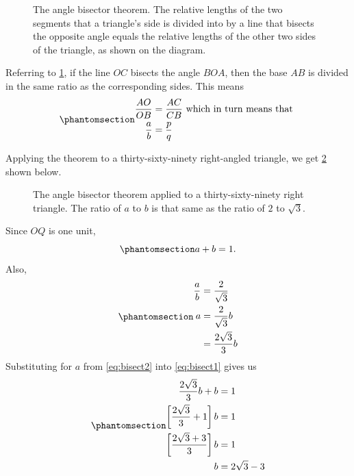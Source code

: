\documentclass[
  a4paper,
]{article}
\begin{document}
\begin{figure}
\centering

\caption{The angle bisector theorem. The relative lengths of the two
segments that a triangle's side is divided into by a line that bisects
the opposite angle equals the relative lengths of the other two sides of
the triangle, as shown on the diagram.}\label{fig:angle-bisector}
\end{figure}

Referring to \cref{fig:angle-bisector}, if the line \(OC\) bisects the
angle \(BOA\), then the base \(AB\) is divided in the same ratio as the
corresponding sides. This means
\begin{equation}\phantomsection\label{eq:angle-bisector}{
\begin{aligned}
\frac{AO}{OB} &= \frac{AC}{CB} \mbox{ which in turn means that }\\
\frac{a}{b} &= \frac{p}{q}\\
\end{aligned}
}\end{equation}

Applying the theorem to a thirty-sixty-ninety right-angled triangle, we
get \cref{fig:bisect-thirty} shown below.

\begin{figure}
\centering

\caption{The angle bisector theorem applied to a thirty-sixty-ninety
right triangle. The ratio of \(a\) to \(b\) is that same as the ratio of
\(2\) to \(\sqrt{3}\).}\label{fig:bisect-thirty}
\end{figure}

Since \(OQ\) is one unit,
\begin{equation}\phantomsection\label{eq:bisect1}{
a+b = 1.
}\end{equation} Also, \begin{equation}\phantomsection\label{eq:bisect2}{
\begin{aligned}
\frac{a}{b} &= \frac{2}{\sqrt{3}}\\
a &= \frac{2}{\sqrt{3}}b\\
&= \frac{2\sqrt{3}}{3}b\\
\end{aligned}
}\end{equation} Substituting for \(a\) from \cref{eq:bisect2} into
\cref{eq:bisect1} gives us
\begin{equation}\phantomsection\label{eq:bisect3}{
\begin{aligned}
\frac{2\sqrt{3}}{3}b + b &= 1\\ 
\left[\frac{2\sqrt{3}}{3} + 1\right] b &= 1\\
\left[\frac{2\sqrt{3} + 3}{3}\right] b &= 1\\
b &= 2\sqrt{3} - 3\\
\end{aligned}
}\end{equation}
\end{document}
